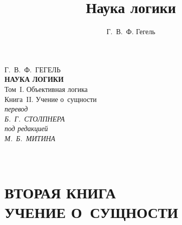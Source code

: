 \documentclass[a5paper, 11pt, twoside, onecolumn, openany]{memoir}
\author{Г.~В.~Ф. Гегель}
\title{Наука логики}
\date{}
\begin{document}
\frontmatter
\pagestyle{empty}

{\centering
  {\Large Г.~В.~Ф.~ГЕГЕЛЬ} \\
  \vspace{130pt}
  \textbf{\Huge НАУКА ЛОГИКИ} \\
  \vspace{60pt}
  {\Large Том~I. Объективная логика} \\
  \vspace{8pt}
  {\large Книга~II. Учение о~сущности} \\
  \vspace{70pt}
  \textit{перевод} \\
  \textit{Б.~Г.~СТОЛПНЕРА} \\
  \vspace{10pt}
  \textit{под редакцией} \\
  \textit{М.~Б.~МИТИНА}
\par}

\clearpage

\mainmatter
\pagestyle{plain}


\part[\hspace{38mm}УЧЕНИЕ О~СУЩНОСТИ]%
     {\ \\\vspace{200pt}\Large\mdseries ВТОРАЯ КНИГА \\
      \LARGE\bfseries УЧЕНИЕ О~СУЩНОСТИ}
\thispagestyle{empty}
\clearpage







\end{document}

